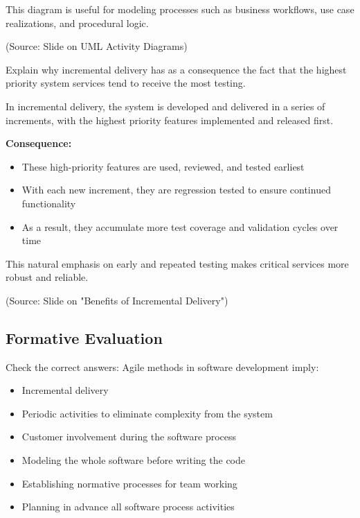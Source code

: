 \documentclass[12pt]{article}
\begin{document}
This diagram is useful for modeling processes such as business workflows, use case realizations, and procedural logic.

(Source: Slide on UML Activity Diagrams)

\begin{questionbox}
Explain why incremental delivery has as a consequence the fact that the highest priority system services tend to receive the most testing.
\end{questionbox}

In incremental delivery, the system is developed and delivered in a series of increments, with the highest priority features implemented and released first.

\textbf{Consequence:}
\begin{itemize}
    \item These high-priority features are used, reviewed, and tested earliest
    \item With each new increment, they are regression tested to ensure continued functionality
    \item As a result, they accumulate more test coverage and validation cycles over time
\end{itemize}

This natural emphasis on early and repeated testing makes critical services more robust and reliable.

(Source: Slide on "Benefits of Incremental Delivery")

\subsection{Formative Evaluation}

\begin{questionbox}
Check the correct answers: Agile methods in software development imply:
\end{questionbox}

\begin{itemize}
    \item[ ] Incremental delivery
    \item[ ] Periodic activities to eliminate complexity from the system
    \item[ ] Customer involvement during the software process
    \item[ ] Modeling the whole software before writing the code
    \item[ ] Establishing normative processes for team working
    \item[ ] Planning in advance all software process activities
\end{itemize}
\end{document}

